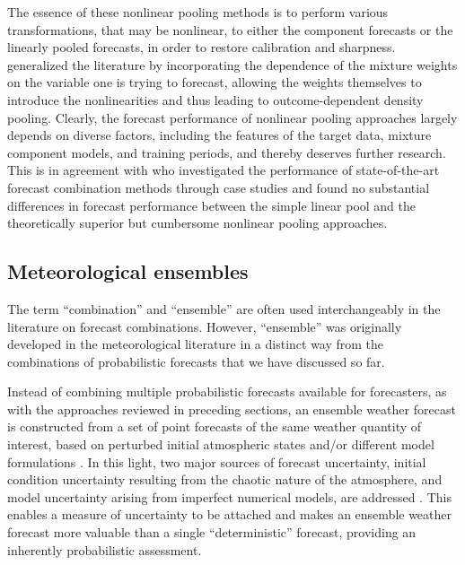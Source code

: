 \documentclass[11pt]{article}
\begin{document}
The essence of these nonlinear pooling methods is to perform various transformations, that may be nonlinear, to either the component forecasts or the linearly pooled forecasts, in order to restore calibration and sharpness. \citet{Kapetanios2015-bb} generalized the literature by incorporating the dependence of the mixture weights on the variable one is trying to forecast, allowing the weights themselves to introduce the nonlinearities and thus leading to outcome-dependent density pooling. Clearly, the forecast performance of nonlinear pooling approaches largely depends on diverse factors, including the features of the target data, mixture component models, and training periods, and thereby deserves further research. This is in agreement with \citet{Baran2018-nm} who investigated the performance of state-of-the-art forecast combination methods through case studies and found no substantial differences in forecast performance between the simple linear pool and the theoretically superior but cumbersome nonlinear pooling approaches.

\subsection{Meteorological ensembles}
\label{sec:weather}

The term ``combination'' and ``ensemble'' are often used interchangeably in the literature on forecast combinations. However, ``ensemble'' was originally developed in the meteorological literature in a distinct way from the combinations of probabilistic forecasts that we have discussed so far.

Instead of combining multiple probabilistic forecasts available for forecasters, as with the approaches reviewed in preceding sections, an ensemble weather forecast is constructed from a set of point forecasts of the same weather quantity of interest, based on perturbed initial atmospheric states \citep[e.g.,][]{Maqsood2004-pe,Gneiting2005-yn} and/or different model formulations \citep[e.g.,][]{Buizza1999-st,Buizza2005-wf}. In this light, two major sources of forecast uncertainty, initial condition uncertainty resulting from the chaotic nature of the atmosphere, and model uncertainty arising from imperfect numerical models, are addressed \citep{Lorenz1963-yn,Weigel2008-vy,Baran2014-tm}. This enables a measure of uncertainty to be attached and makes an ensemble weather forecast more valuable than a single ``deterministic'' forecast, providing an inherently probabilistic assessment.
\end{document}
